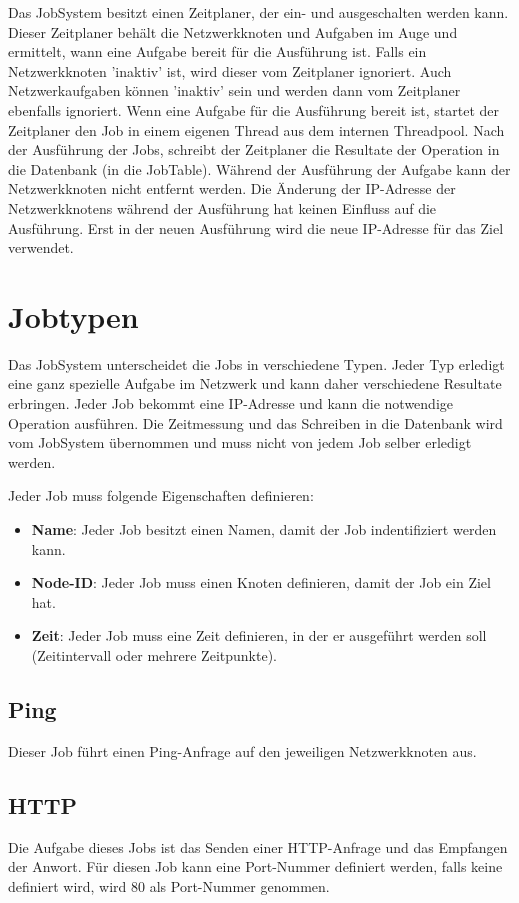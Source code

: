 \documentclass[12pt,a4paper]{report}
\begin{document}
\begin{onehalfspace}
Das JobSystem besitzt einen Zeitplaner, der ein- und ausgeschalten werden kann. Dieser Zeitplaner behält die Netzwerkknoten und Aufgaben im Auge und ermittelt, wann eine Aufgabe bereit für die Ausführung ist. Falls ein Netzwerkknoten 'inaktiv' ist, wird dieser vom Zeitplaner ignoriert. Auch Netzwerkaufgaben können 'inaktiv' sein und werden dann vom Zeitplaner ebenfalls ignoriert. Wenn eine Aufgabe für die Ausführung bereit ist, startet der Zeitplaner den Job in einem eigenen Thread aus dem internen Threadpool. Nach der Ausführung der Jobs, schreibt der Zeitplaner die Resultate der Operation in die Datenbank (in die JobTable). Während der Ausführung der Aufgabe kann der Netzwerkknoten nicht entfernt werden. Die Änderung der IP-Adresse der Netzwerkknotens während der Ausführung hat keinen Einfluss auf die Ausführung. Erst in der neuen Ausführung wird die neue IP-Adresse für das Ziel verwendet.

\section{Jobtypen}

Das JobSystem unterscheidet die Jobs in verschiedene Typen. Jeder Typ erledigt eine ganz spezielle Aufgabe im Netzwerk und kann daher verschiedene Resultate erbringen. Jeder Job bekommt eine IP-Adresse und kann die notwendige Operation ausführen. Die Zeitmessung und das Schreiben in die Datenbank wird vom JobSystem übernommen und muss nicht von jedem Job selber erledigt werden.

Jeder Job muss folgende Eigenschaften definieren:
\begin{itemize}
\item \textbf{Name}: Jeder Job besitzt einen Namen, damit der Job indentifiziert werden kann.
\item \textbf{Node-ID}: Jeder Job muss einen Knoten definieren, damit der Job ein Ziel hat.
\item \textbf{Zeit}: Jeder Job muss eine Zeit definieren, in der er ausgeführt werden soll (Zeitintervall oder mehrere Zeitpunkte).
\end{itemize}

\subsection{Ping} Dieser Job führt einen Ping-Anfrage auf den jeweiligen Netzwerkknoten aus.

\subsection{HTTP} Die Aufgabe dieses Jobs ist das Senden einer HTTP-Anfrage und das Empfangen der Anwort. Für diesen Job kann eine Port-Nummer definiert werden, falls keine definiert wird, wird 80 als Port-Nummer genommen.


\end{onehalfspace}
\end{document}
